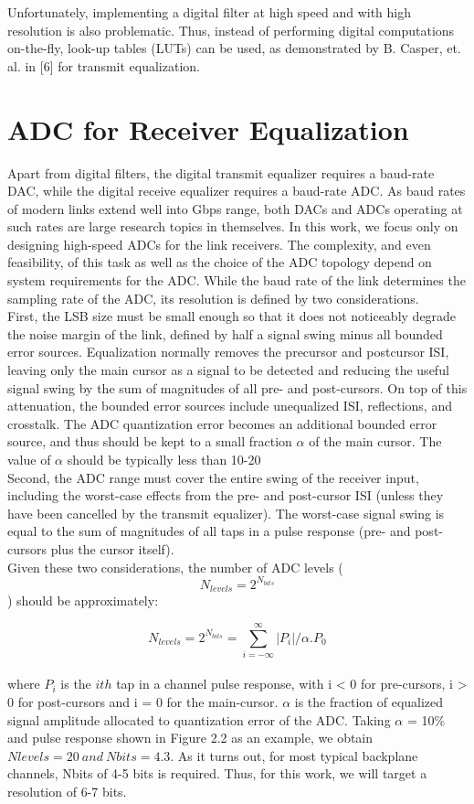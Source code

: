 Unfortunately, implementing a digital filter at high speed and with high 
resolution is also problematic. Thus, instead of performing digital computations on-the-fly, look-up tables (LUTs) can be used, as demonstrated by B. Casper, et. al. in 
[6] for transmit equalization.



\section{ADC for Receiver Equalization}

Apart from digital filters, the digital transmit equalizer requires a baud-rate 
DAC, while the digital receive equalizer requires a baud-rate ADC. As baud rates of 
modern links extend well into Gbps range, both DACs and ADCs operating at such 
rates are large research topics in themselves. In this work, we focus only on designing 
high-speed ADCs for the link receivers. The complexity, and even feasibility, of this 
task as well as the choice of the ADC topology depend on system requirements for the 
ADC. While the baud rate of the link determines the sampling rate of the ADC, its 
resolution is defined by two considerations. \\
First, the LSB size must be small enough so that it does not noticeably degrade 
the noise margin of the link, defined by half a signal swing minus all bounded error 
sources. Equalization normally removes the precursor and postcursor ISI, leaving only 
the main cursor as a signal to be detected and reducing the useful signal swing by the 
sum of magnitudes of all pre- and post-cursors. On top of this attenuation, the bounded 
error sources include unequalized ISI, reflections, and crosstalk. The ADC 
quantization error becomes an additional bounded error source, and thus should be 
kept to a small fraction $\alpha$ of the main cursor. The value of $\alpha$ should be typically less 
than 10-20%
\\
Second, the ADC range must cover the entire swing of the receiver input, 
including the worst-case effects from the pre- and post-cursor ISI (unless they have 
been cancelled by the transmit equalizer). The worst-case signal swing is equal to the 
sum of magnitudes of all taps in a pulse response (pre- and post-cursors plus the cursor 
itself).\\
Given these two considerations, the number of ADC levels ( $$ N_{levels}=2^{N_{bits}} $$ ) 
should be approximately: 

$$ N_{levels}=2^{N_{bits}}=\sum_{i=-\infty}^{\infty} |P_i|/{\alpha.P_0} $$\\

where $P_{i}$ is the $i{th}$ tap in a channel pulse response, with i < 0 for pre-cursors, i > 0 for post-cursors and i = 0 for the main-cursor. $\alpha$ is the fraction of equalized signal 
amplitude allocated to quantization error of the ADC. Taking $\alpha$ = 10\% and pulse 
response shown in Figure 2.2 as an example, we obtain $N{levels} = 20 \ and\  N{bits} = 4.3$. As it 
turns out, for most typical backplane channels, N{bits} of 4-5 bits is required. Thus, for 
this work, we will target a resolution of 6-7 bits.


